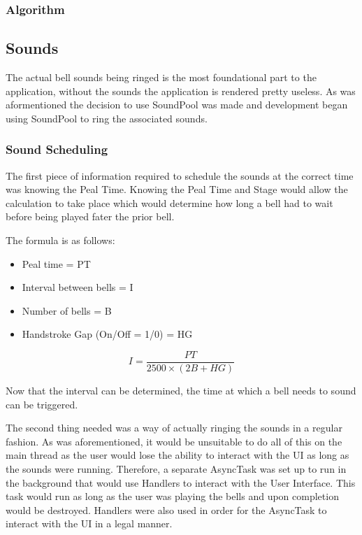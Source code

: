 \documentclass{l4proj}
\begin{document}
\subsubsection{Algorithm}


\subsection{Sounds}
The actual bell sounds being ringed is the most foundational part to the application, without the sounds the application is rendered pretty useless. As was aformentioned the decision to use SoundPool was made and development began using SoundPool to ring the associated sounds.
\subsubsection{Sound Scheduling}
The first piece of information required to schedule the sounds at the correct time was knowing the Peal Time. Knowing the Peal Time and Stage would allow the calculation to take place which would determine how long a bell had to wait before being played fater the prior bell.  

The formula is as follows: 
\begin{itemize}
\item Peal time = PT
\item Interval between bells = I
\item Number of bells = B
\item Handstroke Gap (On/Off = 1/0) = HG
\end{itemize}

\begin{equation}
I = \frac{PT}{2500\times(2B + HG)}
\end{equation}

Now that the interval can be determined, the time at which a bell needs to sound can be triggered. 

The second thing needed was a way of actually ringing the sounds in a regular fashion.  As was aforementioned, it would be unsuitable to do all of this on the main thread as the user would lose the ability to interact with the UI as long as the sounds were running.  Therefore, a separate AsyncTask was set up to run in the background that would use Handlers to interact with the User Interface.  This task would run as long as the user was playing the bells and upon completion would be destroyed.  Handlers were also used in order for the AsyncTask to interact with the UI in a legal manner.
\end{document}
